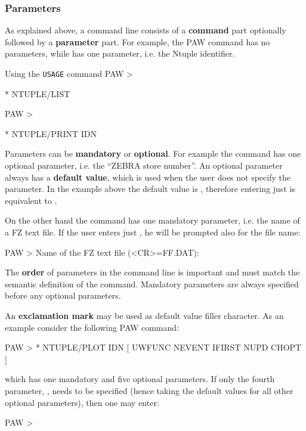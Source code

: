 %
%
\subsubsection{Parameters}


As explained above, a command line consists of a {\bf command} part optionally
followed by a {\bf parameter} part.
For example, the PAW command 
has no parameters, while  has one parameter,
i.e. the Ntuple identifier. 

\begin{XMPt}{Using the {\tt USAGE} command}
PAW > 

 * NTUPLE/LIST

PAW > 

 * NTUPLE/PRINT  IDN
\end{XMPt}

Parameters can be {\bf mandatory} or {\bf optional}. 
For example the command 
has one optional parameter, i.e. the ``ZEBRA store number''.
An optional parameter always has a {\bf default value},
which is used when the user does not specify the parameter. 
In the example above the default value is ,
therefore entering just  is equivalent to .

\newpage

On the other hand the command 
has one mandatory parameter, i.e. the name of a FZ text file.
If the user enters just , 
he will be prompted also for the file name:
\begin{XMP}
PAW > 
Name of the FZ text file (<CR>=FF.DAT): 
\end{XMP}

The {\bf order}
of parameters in the command line is important and must match
the semantic definition of the command.
Mandatory parameters are always specified before any
optional parameters.

An {\bf exclamation mark}
may be used as default value filler character.
As an example consider the following PAW command:
\begin{XMP}
PAW > 
 * NTUPLE/PLOT  IDN [ UWFUNC NEVENT IFIRST NUPD CHOPT ]
\end{XMP}
which has one mandatory and five optional parameters.
If only the fourth parameter, , needs to be specified
(hence taking the default
values for all other optional parameters), then one may enter:
\begin{XMP}
PAW > 
\end{XMP}

